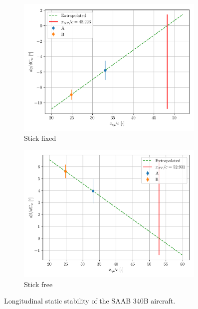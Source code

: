 \documentclass{article}
\begin{document}
\begin{figure}[H]
    \centering
    \begin{subfigure}{0.45\textwidth}
        \centering
        \includegraphics[width=0.99\textwidth]{../exercise1/Longitudinal_Static_Stability_2.png}
        \caption{Stick fixed}
    \end{subfigure}
    \begin{subfigure}{0.45\textwidth}
        \centering
        \includegraphics[width=0.99\textwidth]{../exercise1/Longitudinal_Static_Stability_4.png}
        \caption{Stick free}
    \end{subfigure}
    \caption{Longitudinal static stability of the SAAB 340B aircraft.}
    \label{fig:longitudinal_static_stability}
\end{figure}
\end{document}
